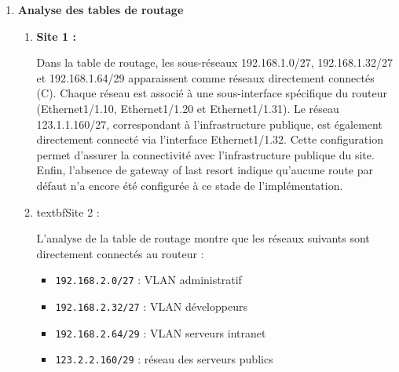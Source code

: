 \documentclass[12pt,a4paper, oneside]{memoir}
\begin{document}
\begin{enumerate}
\begin{enumerate}
\begin{figure}[H]
	\caption{Configuration des sous-interfaces VLAN sur le routeur du site 2}
\end{figure}	
	
	Ces captures permettent d'observer plusieurs éléments importants :
	\begin{itemize}
		\item les sous-interfaces créées sur l'interface physique e1/1(e.g. \texttt{e1/1.10}, \texttt{e1/1.20}, etc.) ;
		\item les adresses IP attribuées à chacune d’elles, jouant le rôle de passerelle pour les VLANs ;
		\item l’état \texttt{up} des interfaces, indiquant leur bon fonctionnement ;
		\item les réseaux directement joignables à travers chaque sous-interface, permettant d’assurer le routage inter-VLAN.
	\end{itemize}
\end{enumerate}

	\item \textbf{Analyse des tables de routage}
		\begin{enumerate}
			\item \textbf{Site 1 :} 
	
	Dans la table de routage, les sous-réseaux 192.168.1.0/27, 192.168.1.32/27 et 192.168.1.64/29 apparaissent comme réseaux directement connectés (C). Chaque réseau est associé à une sous-interface spécifique du routeur (Ethernet1/1.10, Ethernet1/1.20 et Ethernet1/1.31).
	Le réseau 123.1.1.160/27, correspondant à l’infrastructure publique, est également directement connecté via l’interface Ethernet1/1.32.
	Cette configuration permet d'assurer la connectivité avec l'infrastructure publique du site.
	Enfin, l'absence de gateway of last resort indique qu’aucune route par défaut n’a encore été configurée à ce stade de l’implémentation.


		\item textbf{Site 2 :}

L'analyse de la table de routage montre que les réseaux suivants sont directement connectés au routeur :

\begin{itemize}
	\item \texttt{192.168.2.0/27} : VLAN administratif
	\item \texttt{192.168.2.32/27} : VLAN développeurs
	\item \texttt{192.168.2.64/29} : VLAN serveurs intranet
	\item \texttt{123.2.2.160/29} : réseau des serveurs publics
\end{itemize}


\end{enumerate}
\end{enumerate}
\end{document}
